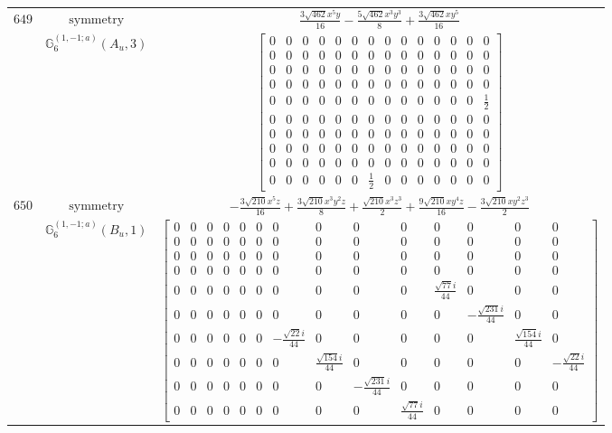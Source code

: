 \documentclass[fleqn,8pt,landscape]{jsarticle}
\begin{document}
\begin{longtable}{ccc}
$ 649 $ & $ \text{symmetry} $ & $ \frac{3 \sqrt{462} x^{5} y}{16} - \frac{5 \sqrt{462} x^{3} y^{3}}{8} + \frac{3 \sqrt{462} x y^{5}}{16} $ \\
$  $ & $ \mathbb{G}_{6}^{(1,-1;a)}(A_{u},3) $ & $ \begin{bmatrix} 0 & 0 & 0 & 0 & 0 & 0 & 0 & 0 & 0 & 0 & 0 & 0 & 0 & 0 \\ 0 & 0 & 0 & 0 & 0 & 0 & 0 & 0 & 0 & 0 & 0 & 0 & 0 & 0 \\ 0 & 0 & 0 & 0 & 0 & 0 & 0 & 0 & 0 & 0 & 0 & 0 & 0 & 0 \\ 0 & 0 & 0 & 0 & 0 & 0 & 0 & 0 & 0 & 0 & 0 & 0 & 0 & 0 \\ 0 & 0 & 0 & 0 & 0 & 0 & 0 & 0 & 0 & 0 & 0 & 0 & 0 & \frac{1}{2} \\ 0 & 0 & 0 & 0 & 0 & 0 & 0 & 0 & 0 & 0 & 0 & 0 & 0 & 0 \\ 0 & 0 & 0 & 0 & 0 & 0 & 0 & 0 & 0 & 0 & 0 & 0 & 0 & 0 \\ 0 & 0 & 0 & 0 & 0 & 0 & 0 & 0 & 0 & 0 & 0 & 0 & 0 & 0 \\ 0 & 0 & 0 & 0 & 0 & 0 & 0 & 0 & 0 & 0 & 0 & 0 & 0 & 0 \\ 0 & 0 & 0 & 0 & 0 & 0 & \frac{1}{2} & 0 & 0 & 0 & 0 & 0 & 0 & 0 \end{bmatrix} $ \\ \hline
$ 650 $ & $ \text{symmetry} $ & $ - \frac{3 \sqrt{210} x^{5} z}{16} + \frac{3 \sqrt{210} x^{3} y^{2} z}{8} + \frac{\sqrt{210} x^{3} z^{3}}{2} + \frac{9 \sqrt{210} x y^{4} z}{16} - \frac{3 \sqrt{210} x y^{2} z^{3}}{2} $ \\
$  $ & $ \mathbb{G}_{6}^{(1,-1;a)}(B_{u},1) $ & $ \begin{bmatrix} 0 & 0 & 0 & 0 & 0 & 0 & 0 & 0 & 0 & 0 & 0 & 0 & 0 & 0 \\ 0 & 0 & 0 & 0 & 0 & 0 & 0 & 0 & 0 & 0 & 0 & 0 & 0 & 0 \\ 0 & 0 & 0 & 0 & 0 & 0 & 0 & 0 & 0 & 0 & 0 & 0 & 0 & 0 \\ 0 & 0 & 0 & 0 & 0 & 0 & 0 & 0 & 0 & 0 & 0 & 0 & 0 & 0 \\ 0 & 0 & 0 & 0 & 0 & 0 & 0 & 0 & 0 & 0 & \frac{\sqrt{77} i}{44} & 0 & 0 & 0 \\ 0 & 0 & 0 & 0 & 0 & 0 & 0 & 0 & 0 & 0 & 0 & - \frac{\sqrt{231} i}{44} & 0 & 0 \\ 0 & 0 & 0 & 0 & 0 & 0 & - \frac{\sqrt{22} i}{44} & 0 & 0 & 0 & 0 & 0 & \frac{\sqrt{154} i}{44} & 0 \\ 0 & 0 & 0 & 0 & 0 & 0 & 0 & \frac{\sqrt{154} i}{44} & 0 & 0 & 0 & 0 & 0 & - \frac{\sqrt{22} i}{44} \\ 0 & 0 & 0 & 0 & 0 & 0 & 0 & 0 & - \frac{\sqrt{231} i}{44} & 0 & 0 & 0 & 0 & 0 \\ 0 & 0 & 0 & 0 & 0 & 0 & 0 & 0 & 0 & \frac{\sqrt{77} i}{44} & 0 & 0 & 0 & 0 \end{bmatrix} $ \\ \hline

\end{longtable}
\end{document}
